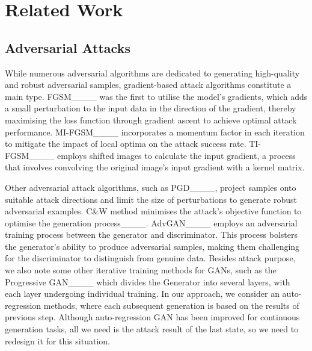 \section{Related Work}
\subsection{Adversarial Attacks}
While numerous adversarial algorithms are dedicated to generating high-quality and robust adversarial samples, gradient-based attack algorithms constitute a main type. FGSM____ was the first to utilise the model's gradients, which adds a small perturbation to the input data in the direction of the gradient, thereby maximising the loss function through gradient ascent to achieve optimal attack performance. MI-FGSM____ incorporates a momentum factor in each iteration to mitigate the impact of local optima on the attack success rate. TI-FGSM____ employs shifted images to calculate the input gradient, a process that involves convolving the original image's input gradient with a kernel matrix.

Other adversarial attack algorithms, such as PGD____, project samples onto suitable attack directions and limit the size of perturbations to generate robust adversarial examples. C\&W method minimises the attack's objective function to optimise the generation process____. AdvGAN____ employs an adversarial training process between the generator and discriminator. This process bolsters the generator's ability to produce adversarial samples, making them challenging for the discriminator to distinguish from genuine data. Besides attack purpose, we also note some other iterative training methods for GANs, such as the Progressive GAN____ which divides the Generator into several layers, with each layer undergoing individual training. In our approach, we consider an auto-regression methods, where each subsequent generation is based on the results of previous step. Although auto-regression GAN has been improved for continuous generation tasks, all we need is the attack result of the last state, so we need to redesign it for this situation.

